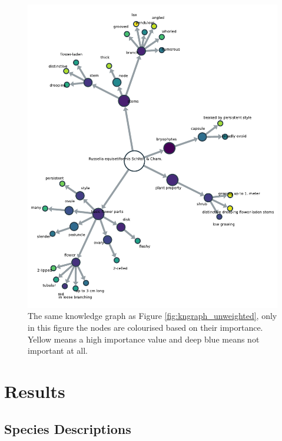 \documentclass[a4paper, 12pt, oneside]{book} %
\begin{document}
\begin{figure} [htpb]
    \centering
    \includegraphics[width=\textwidth]{figures/kngraph_weighted.pdf}
    \caption[Example of an weighted knowledge graph]{The same knowledge graph as Figure \ref{fig:kngraph_unweighted}, only in this figure the nodes are colourised based on their importance. Yellow means a high importance value and deep blue means not important at all.}
    \label{fig:kngraph_weighted}
\end{figure}

\newpage
\section{Results} \label{par:results}
\subsection{Species Descriptions}
\end{document}
